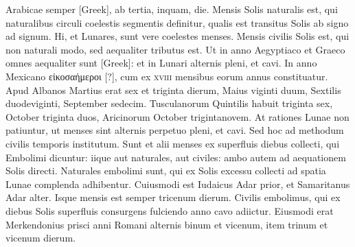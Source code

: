 Arabicae semper \textgreek{[Greek]},
ab tertia, inquam, die.
Mensis Solis naturalis est,
qui naturalibus circuli coelestis segmentis definitur, qualis est transitus
Solis ab signo ad signum.
Hi, et Lunares, sunt vere coelestes menses.
Mensis civilis Solis est, qui non naturali modo, sed aequaliter tributus
est.
Ut in anno Aegyptiaco et Graeco omnes aequaliter sunt
 \textgreek{[Greek]}: et in Lunari alternis pleni, et cavi.
In anno Mexicano \textgreek{εἰκοσαήμεροι [?]},
cum ex \textsc{xviii} mensibus eorum annus constituatur.
Apud Albanos
Martius erat sex et triginta dierum, Maius viginti duum, Sextilis
duodeviginti, September sedecim.
Tusculanorum Quintilis habuit
triginta sex, October triginta duos, Aricinorum October trigintanovem.
At rationes Lunae non patiuntur, ut menses sint alternis
perpetuo pleni, et cavi.
Sed hoc ad methodum civilis temporis institutum.
Sunt et alii menses ex superfluis diebus collecti, qui Embolimi
dicuntur: iique aut naturales, aut civiles: ambo autem ad aequationem
Solis directi.
Naturales embolimi sunt, qui ex Solis excessu collecti
ad spatia Lunae complenda adhibentur.
Cuiusmodi est Iudaicus
Adar prior, et Samaritanus Adar alter.
Isque mensis est semper tricenum dierum.
Civilis embolimus, qui ex diebus Solis superfluis consurgens
fulciendo anno cavo adiictur.
Eiusmodi erat Merkendonius
prisci anni Romani alternis binum et vicenum, item trinum et vicenum
dierum.

